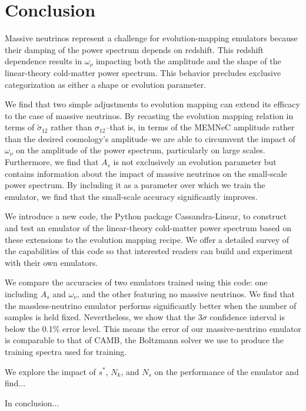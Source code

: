 \chapter{Conclusion}
\label{chap: conclusion}

Massive neutrinos represent a challenge for evolution-mapping emulators
because their damping of the power spectrum depends on redshift.
This redshift dependence results in $\omega_\nu$ impacting both the
amplitude and the shape of the linear-theory cold-matter power spectrum.
This behavior precludes exclusive categorization as either a shape or
evolution parameter.

We find that two simple adjustments to evolution mapping can extend its
efficacy to the case of massive neutrinos. By recasting the evolution mapping
relation in terms of $\tilde{\sigma}_12$ rather than $\sigma_{12}$--that is,
in terms of the MEMNeC amplitude rather than the desired cosmology's
amplitude--we are able to circumvent the impact of $\omega_\nu$ on the
amplitude of the power spectrum, particularly on large scales. Furthermore,
we find that $A_s$ is not exclusively an evolution parameter but contains
information about the impact of massive neutrinos on the small-scale
power spectrum. By including it as a parameter over which we train the
emulator, we find that the small-scale accuracy significantly improves.

We introduce a new code, the Python package Cassandra-Linear, to construct
and test an emulator of the linear-theory cold-matter power spectrum based on
these extensions to the evolution mapping recipe. We offer a detailed survey
of the capabilities of this code so that interested readers can build and
experiment with their own emulators.

We compare the accuracies of two emulators trained using this code: one
including $A_s$ and $\omega_\nu$, and the other featuring no massive 
neutrinos. We find that the massless-neutrino emulator performs significantly
better when the number of samples is held fixed. Nevertheless, we show that
the $3\sigma$ confidence interval is below the 0.1\% error level. This means
the error of our massive-neutrino emulator is
comparable to that of CAMB, the Boltzmann solver we use to produce the
training spectra used for training.

We explore the impact of $s^*$, $N_k$, and $N_s$ on the performance of the
emulator and find...

In conclusion...



